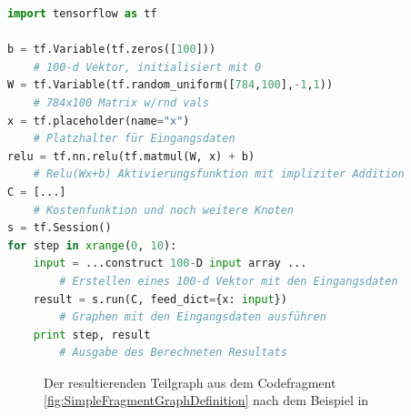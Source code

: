 \begin{lstlisting}[caption={TensorFlow Codefragment zur Definition eines Teils des Graphen},label=fig:SimpleFragmentGraphDefinition,captionpos=b,language=Python]
import tensorflow as tf

b = tf.Variable(tf.zeros([100])) 
	# 100-d Vektor, initialisiert mit 0
W = tf.Variable(tf.random_uniform([784,100],-1,1)) 
	# 784x100 Matrix w/rnd vals
x = tf.placeholder(name="x") 
	# Platzhalter für Eingangsdaten
relu = tf.nn.relu(tf.matmul(W, x) + b) 
	# Relu(Wx+b) Aktivierungsfunktion mit impliziter Addition
C = [...] 
	# Kostenfunktion und noch weitere Knoten
s = tf.Session()
for step in xrange(0, 10):
	input = ...construct 100-D input array ... 
		# Erstellen eines 100-d Vektor mit den Eingangsdaten
	result = s.run(C, feed_dict={x: input}) 
		# Graphen mit den Eingangsdaten ausführen
	print step, result 
		# Ausgabe des Berechneten Resultats
\end{lstlisting}
\begin{figure}
	\centering


	\caption{Der resultierenden Teilgraph aus dem Codefragment \ref{fig:SimpleFragmentGraphDefinition} nach dem Beispiel in \cite{wp2015tensorflow}}
	\label{fig:SimpleFragmentGraphPic}
\end{figure}
